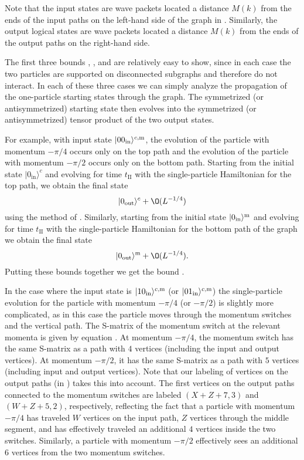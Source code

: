 \documentclass[../thesis-main/thesis-main]{subfiles}
\begin{document}
Note that the input states are wave packets located a distance $M(k)$ from the ends of the input paths on the left-hand side of the graph in . Similarly, the output logical states are wave packets located a distance $M(k)$ from the ends of the output paths on the right-hand side.

The first three bounds , , and  are relatively easy to show, since in each case the two particles are supported on disconnected subgraphs and therefore do not interact. In each of these three cases we can simply analyze the propagation of the one-particle starting states through the graph. The symmetrized (or antisymmetrized) starting state then evolves into the symmetrized (or antisymmetrized) tensor product of the two output states.

For example, with input state $|00_{\text{in}}\rangle^{c,\mathrm{m}}$, the evolution of the particle with momentum $-{\pi}/{4}$ occurs only on the top path and the evolution of the particle with momentum $-{\pi}/{2}$ occurs only on the bottom path. Starting from the initial state $|0_\text{in}\rangle^c$ and evolving for time $t_{\mathrm{II}}$ with the single-particle Hamiltonian for the top path, we obtain the final state
\[
|0_\text{out}\rangle^c+\O(L^{-{1}/{4}})
\]
using the method of . Similarly, starting from the initial state $|0_\text{in}\rangle^{\mathrm{m}}$ and evolving for time $t_{\mathrm{II}}$ with the single-particle Hamiltonian
for the bottom path of the graph we obtain the final state
\[
|0_\text{out}\rangle^{\med}+\O(L^{-{1}/{4}}).
\]
Putting these bounds together we get the bound .

In the case where the input state is $|10_{\text{in}}\rangle^{c,\mathrm{m}}$ (or $|01_{\text{in}}\rangle^{c,\mathrm{m}}$) the single-particle evolution for the particle with momentum $-{\pi}/{4}$ (or $-{\pi}/{2}$) is slightly more complicated, as in this case the particle moves through the momentum switches and the vertical path. The S-matrix of the momentum switch at the relevant momenta is given by equation . At momentum $-{\pi}/{4}$, the momentum switch has the same S-matrix as a path with $4$ vertices (including the input and output vertices). At momentum $-{\pi}/{2}$, it has the same S-matrix as a path with $5$ vertices (including input and output vertices). Note that our labeling of vertices on the output paths (in ) takes this into account. The first vertices on the output paths connected to the momentum switches are labeled $(X+Z+7,3)$ and $(W+Z+5,2)$, respectively, reflecting the fact that a particle with momentum $-{\pi}/{4}$ has traveled $W$ vertices on the input path, $Z$ vertices through the middle segment, and has effectively traveled an additional $4$ vertices inside the two switches. Similarly, a particle with momentum $-{\pi}/{2}$ effectively sees an additional $6$ vertices from the two momentum switches.
\end{document}
